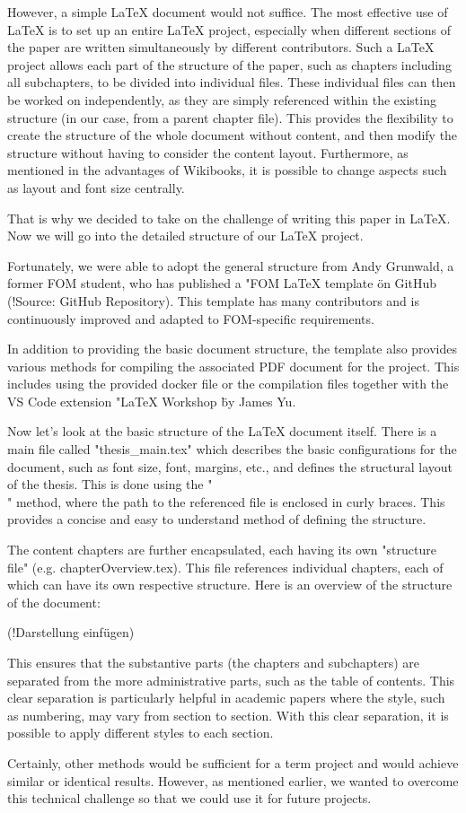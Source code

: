 However, a simple \LaTeX{} document would not suffice. The most effective use of \LaTeX{} is to set up an entire \LaTeX{} project, especially when different sections of the paper are written simultaneously by different contributors. Such a \LaTeX{} project allows each part of the structure of the paper, such as chapters including all subchapters, to be divided into individual files. These individual files can then be worked on independently, as they are simply referenced within the existing structure (in our case, from a parent chapter file). This provides the flexibility to create the structure of the whole document without content, and then modify the structure without having to consider the content layout. Furthermore, as mentioned in the advantages of Wikibooks, it is possible to change aspects such as layout and font size centrally.

That is why we decided to take on the challenge of writing this paper in \LaTeX{}. Now we will go into the detailed structure of our \LaTeX{} project.

Fortunately, we were able to adopt the general structure from Andy Grunwald, a former FOM student, who has published a "FOM \LaTeX{} template \" on GitHub (!Source: GitHub Repository). This template has many contributors and is continuously improved and adapted to FOM-specific requirements.

In addition to providing the basic document structure, the template also provides various methods for compiling the associated PDF document for the project. This includes using the provided docker file or the compilation files together with the VS Code extension "\LaTeX{} Workshop \" by James Yu.

Now let's look at the basic structure of the \LaTeX{} document itself. There is a main file called "thesis\_main.tex" which describes the basic configurations for the document, such as font size, font, margins, etc., and defines the structural layout of the thesis. This is done using the "\\" method, where the path to the referenced file is enclosed in curly braces. This provides a concise and easy to understand method of defining the structure.

The content chapters are further encapsulated, each having its own "structure file" (e.g. chapterOverview.tex). This file references individual chapters, each of which can have its own respective structure. Here is an overview of the structure of the document:

(!Darstellung einfügen)

This ensures that the substantive parts (the chapters and subchapters) are separated from the more administrative parts, such as the table of contents. This clear separation is particularly helpful in academic papers where the style, such as numbering, may vary from section to section. With this clear separation, it is possible to apply different styles to each section.

Certainly, other methods would be sufficient for a term project and would achieve similar or identical results. However, as mentioned earlier, we wanted to overcome this technical challenge so that we could use it for future projects.